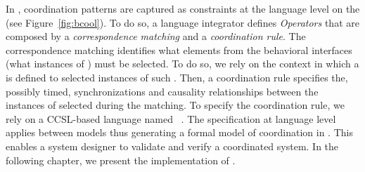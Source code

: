 In \bcool, coordination patterns are captured as constraints at the language level on the \dse (see Figure~\ref{fig:bcool}). To do so, a language integrator defines \emph{Operators} that are composed by a \emph{correspondence matching} and a \emph{coordination rule}. The correspondence matching identifies what elements from the behavioral interfaces (\ie what instances of \dse) must be selected. To do so, we rely on the context in which a \dse is defined to selected instances of such \dse. Then, a coordination rule specifies the, possibly timed, synchronizations and causality relationships between the instances of \dse selected during the matching. To specify the coordination rule, we rely on a CCSL-based language named \moccml~\cite{moccmlbib}. The specification at language level applies between models thus generating a formal model of coordination in \ccsl. This enables a system designer to validate and verify a coordinated system. In the following chapter, we present the implementation of \bcool.
